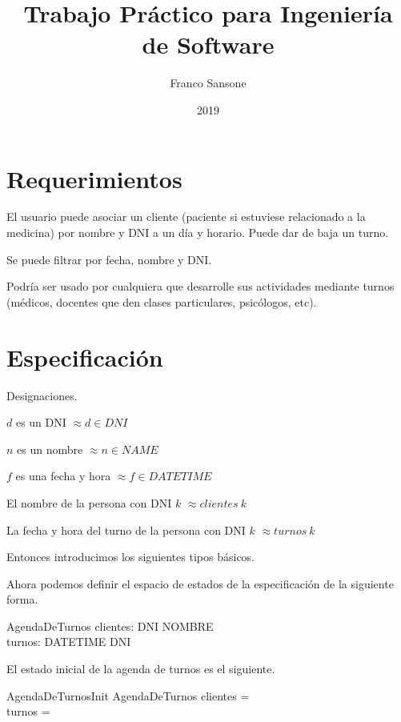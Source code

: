 \documentclass[%
  fleqn,colorlinks,linkcolor=blue,citecolor=blue,urlcolor=blue]{eptcs}
\title{Trabajo Pr\'actico para Ingenier\'i{}a de Software}
\author{Franco Sansone}
\date{2019}
\newcommand{\desig}[2]{\item #1 $\approx #2$}
\newenvironment{designations}
  {\begin{leftbar}
    \begin{list}{}{\setlength{\labelsep}{0cm}
                   \setlength{\labelwidth}{0cm}
                   \setlength{\listparindent}{0cm}
                   \setlength{\rightmargin}{\leftmargin}}}
  {\end{list}\end{leftbar}}
\begin{document}
  \thispagestyle{empty}
  \maketitle

  \section{Requerimientos}
  El usuario puede asociar un cliente (paciente si estuviese relacionado a la medicina) por nombre y DNI a un d\'i{}a y horario. Puede dar de baja un turno.

  Se puede filtrar por fecha, nombre y DNI.

  Podr\'i{}a ser usado por cualquiera que desarrolle sus actividades mediante turnos (m\'edicos, docentes que den clases particulares, psic\'ologos, etc).

  \section{Especificaci\'on}
  Designaciones.

  \begin{designations}
  \desig{$d$ es un DNI}{d \in DNI}
  \desig{$n$ es un nombre}{n \in NAME}
  \desig{$f$ es una fecha y hora}{f \in DATETIME}
  \desig{El nombre de la persona con DNI $k$}{clientes~k}
  \desig{La fecha y hora del turno de la persona con DNI $k$}{turnos~k}
  \end{designations}

  Entonces introducimos los siguientes tipos b\'asicos.

  \begin{zed}
  \end{zed}

  Ahora podemos definir el espacio de estados de la especificaci\'on de la siguiente forma.

  \begin{schema}{AgendaDeTurnos}
  clientes: DNI \pfun NOMBRE \\
  turnos: DATETIME \pfun DNI
  \end{schema}

  El estado inicial de la agenda de turnos es el siguiente.

  \begin{schema}{AgendaDeTurnosInit}
  AgendaDeTurnos
  \where
  clientes = \emptyset \\
  turnos = \emptyset
  \end{schema}
\end{document}
